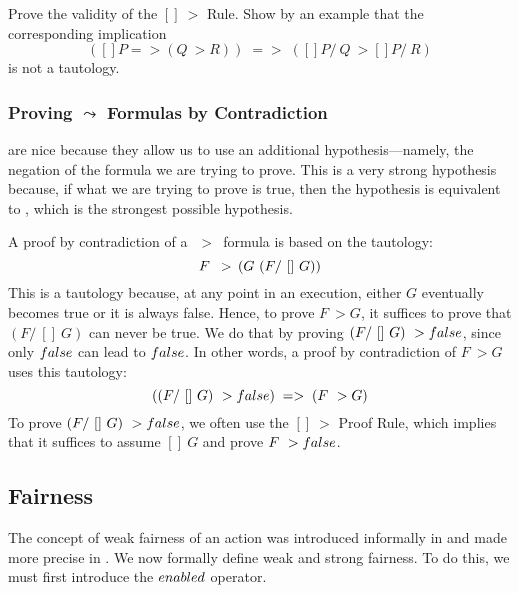 \documentclass[fleqn,leqno]{article}
\begin{document}
\begin{question}
Prove the validity of the $[]~>$ Rule.  Show by an example that
the corresponding implication
 \[([]P => (Q~>R)) \; => \; ([]P /\ Q ~> []P /\ R)
  \]
is not a tautology.
\end{question}
\subsubsection{Proving \protect\ensuremath{\leadsto} Formulas by 
   Contradiction}
%
are nice because they allow us to use an
additional hypothesis---namely, the negation of the formula we are
trying to prove.  This is a very strong hypothesis because, if what we
are trying to prove is true, then the hypothesis is equivalent to
\FALSE, which is the strongest possible hypothesis.

A proof by contradiction of a \,$~>$\, formula is based on the
tautology:
 \[ F \,~>\, (G \,\/ \,(F /\ []~G))
 \]
This is a tautology because, at any point in an execution, either
$G$ eventually becomes true or it is always false.  Hence, to
prove $F~>G$, it suffices to prove that $(F /\ []~G)$ can never be
true.  We do that by proving $(F /\ []~G)~>\FALSE$, since
only $\FALSE$ can lead to $\FALSE$.  In other words, a proof
by contradiction of $F~>G$ uses this tautology:
 \[ ( (F /\ []~G) ~> \FALSE ) \; => \; (F ~> G)
 \]
To prove $(F /\ []~G) ~> \FALSE$, we often use the
$[]~>$ Proof Rule, which implies that it suffices to assume 
$[]~G$ and prove $F ~> \FALSE$.


\medskip



\noindent
\textsf{}



\subsection{Fairness}%


%
The concept of weak fairness of an action was introduced informally
in
and made more precise in 
 .
We now formally define weak and strong fairness.  To do this,
we must first introduce the $\ENABLED$ operator.
\end{document}
